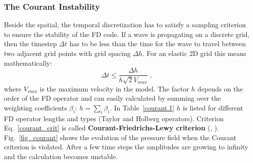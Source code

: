 \subsubsection{The Courant Instability}
\label{courant}
Beside the spatial, the temporal discretization has to satisfy a sampling criterion to ensure the stability of the FD code. If a 
wave is propagating on a discrete grid, then the timestep $\Delta t$ has to be less than the time for the wave to travel between two adjacent grid 
points with grid spacing $\Delta h$. For an elastic 2D grid this means mathematically:
\begin{equation}
    \Delta t \le \frac{\Delta h}{h \sqrt{2} V_{max}}\;,
    \label{courant_crit}
\end{equation}
where $V_{max}$ is the maximum velocity in the model. The factor $h$ depends on the order of the FD operator and can easily calculated by summing over the weighting coefficients $\beta_i$: $h = \sum_i \beta_i$. In Table~\ref{courant.1} $h$ is listed for different FD operator lengths and types (Taylor and Holberg operators). Criterion Eq.~\ref{courant_crit} is called {\textbf{Courant-Friedrichs-Lewy criterion}} (\cite{courant:28}, \cite{courant:67}). 
Fig.~\ref{fig_courant} shows the evolution of the pressure field when the Courant criterion is violated. After a few time steps the amplitudes are growing to infinity and the calculation becomes unstable.
